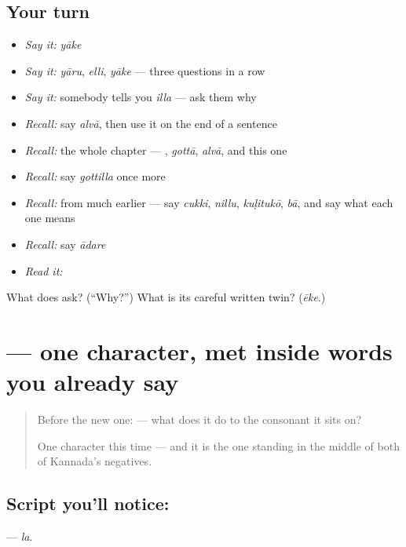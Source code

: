 \subsection*{Your turn}
\begin{itemize}
\raggedright
  \item \emph{Say it:} \emph{yāke}
  \item \emph{Say it:} \emph{yāru}, \emph{elli}, \emph{yāke} — three questions in a row
  \item \emph{Say it:} somebody tells you \emph{illa} — ask them why
  \item \emph{Recall:} say \emph{alvā}, then use it on the end of a sentence
  \item \emph{Recall:} the whole chapter — \emph{}, \emph{gottā}, \emph{alvā}, and this one
  \item \emph{Recall:} say \emph{gottilla} once more
  \item \emph{Recall:} from much earlier — say \emph{cukki}, \emph{nillu}, \emph{kuḷitukō}, \emph{bā}, and say what each one means
  \item \emph{Recall:} say \emph{ādare}
  \item \emph{Read it:} \textbf{}
\end{itemize}

\begin{tcolorbox}[breakable,colback=teal!4,colframe=teal!35!black,title={Before you move on}]
What does  ask? (\textquotedblleft{}Why?\textquotedblright{}) What is its careful written twin? (\emph{ēke}.)
\end{tcolorbox}
\section[\texorpdfstring{\kn{ಲ} (la)}{ಲ (la)}]{ — one character, met inside words you already say}

\label{lesson:KA-S137-letter-la}



\begin{quote}
Before the new one:  — what does it do to the consonant it sits on?

One character this time — and it is the one standing in the middle of both of Kannada's negatives.
\end{quote}

\subsection*{Script you'll notice: }
\textbf{} — \emph{la}.

